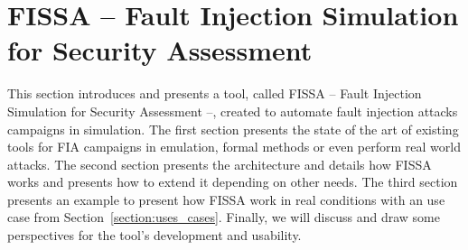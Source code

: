 \chapter{FISSA -- Fault Injection Simulation for Security Assessment}
\label{chapter:fissa}
\minitoc

This section introduces and presents a tool, called FISSA -- Fault Injection Simulation for Security Assessment --, created to automate fault injection attacks campaigns in simulation. 
The first section presents the state of the art of existing tools for FIA campaigns in emulation, formal methods or even perform real world attacks.
The second section presents the architecture and details how FISSA works and presents how to extend it depending on other needs.
The third section presents an example to present how FISSA work in real conditions with an use case from Section~\ref{section:uses_cases}.
Finally, we will discuss and draw some perspectives for the tool's development and usability.

